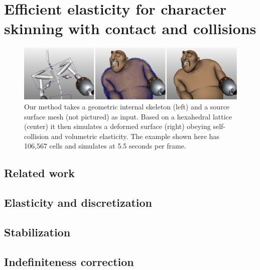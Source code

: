 

\newtheorem{lemma}{Lemma}


\chapter{Efficient elasticity for character skinning with contact and collisions}\label{chap:elasticity}
\begin{figure}[!ht]
\includegraphics[width=\linewidth]{elasticity/figures/teaser3}
  \caption{Our method takes a geometric internal skeleton (left) and a source
    surface mesh (not pictured) as input. Based on a hexahedral lattice (center)
    it then simulates a deformed surface (right) obeying self-collision and volumetric
    elasticity. The example shown here has 106,567 cells and simulates at 5.5
    seconds per frame.}
\end{figure}
%


\section{Related work}
\label{sec:relatedwork}


\section{Elasticity and discretization}
\label{sec:elasticity}


\section{Stabilization}
\label{sec:stabilization}


\section{Indefiniteness correction}
\label{sec:indefiniteness}


